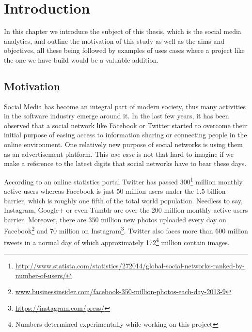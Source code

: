 \chapter{Introduction}
\label{chapter:intro}

In this chapter we introduce the subject of this thesis, which is the social media
analytics, and outline the motivation of this study as well as the aims and
objectives, all these being followed by examples of uses cases where a project
like the one we have build would be a valuable addition.

\section{Motivation}
\label{sec:proj-motivation}

Social Media has become an integral part of modern society, thus many
activities in the software industry emerge around it. In the last few years,
it has been observed that a social network like
Facebook or Twitter started to overcome their initial
purpose of easing access to information sharing or connecting people in the
online environment. One relatively new purpose of social networks is using
them as an advertisement platform. This \textit{use case} is not that hard to
imagine if we make a reference to the latest digits that social networks have
to bear these days.

According to an online statistics portal\cite{statista} Twitter has passed 300\footnote{\url{http://www.statista.com/statistics/272014/global-social-networks-ranked-by-number-of-users/}}
million monthly active users whereas Facebook is just 50 million users under
the 1.5 billion barrier, which is roughly one fifth of the total world population.
Needless to say, Instagram, Google+ or even Tumblr are over the 200
million monthly active users barrier. Moreover, there are 350 million new
photos uploaded every day on Facebook\footnote{\url{www.businessinsider.com/facebook-350-million-photos-each-day-2013-9}}
and 70 million on Instagram\footnote{\url{https://instagram.com/press/}}.
Twitter also faces more than 600 million tweets in a normal day of which
approximately 172\footnote{Numbers determined
experimentally while working on this project} million contain images.

